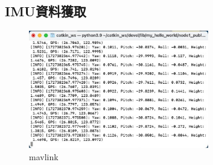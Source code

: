 \documentclass[12pt]{article}       %
\begin{document}

\subsection{IMU資料獲取}
\hspace{2em}
\begin{figure}[H]
    \centering
    \includegraphics[width=0.7\textwidth]{mavlink.jpg}     %
    \caption{mavlink}    %
    \label{fig:mavlink}    %
\end{figure}
\end{document}
